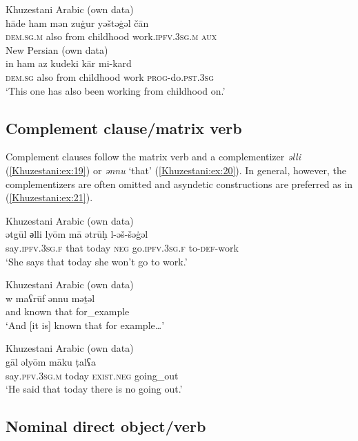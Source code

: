 \documentclass[output=paper,colorlinks,citecolor=brown,draftmode]{langscibook}
\begin{document}
\ea\label{Khuzestani:ex:18}
\ea\label{Khuzestani:ex:18a}
Khuzestani Arabic (own data) \\
\gll hāde ham mən zuġur yəštəġəl čān \\
\textsc{dem.sg.m} also from childhood work\textsc{.ipfv.3sg.m} \textsc{aux} \\
\ex\label{Khuzestani:ex:18b}
New Persian (own data) \\
\gll in ham az kudeki kār mi-kard \\
\textsc{dem.sg} also from childhood work \textsc{prog-}do\textsc{.pst.3sg} \\
\glt `This one has also been working from childhood on.' 
\z
\z


\subsection{Complement clause/matrix verb }\label{Khuzestani:ss:2.7}

Complement clauses follow the matrix verb and a complementizer \textit{əlli} (\ref{Khuzestani:ex:19}) or \textit{ənnu} `that' (\ref{Khuzestani:ex:20}). In general, however, the complementizers are often omitted and asyndetic constructions are preferred as in (\ref{Khuzestani:ex:21}). 

\ea\label{Khuzestani:ex:19}
Khuzestani Arabic (own data) \\
\gll ətgūl әlli lyōm mā ətrūḥ l-əš-šəġəl \\
say\textsc{.ipfv.3sg.f} that today \textsc{neg} go\textsc{.ipfv.3sg.f } to\textsc{-def-}work \\
\glt `She says that today she won't go to work.' 
\z

\ea\label{Khuzestani:ex:20}
Khuzestani Arabic (own data) \\
\gll w maʕrūf ənnu məṯəl \\
and known that for\_example \\
\glt `And [it is] known that for example…' 
\z

\ea\label{Khuzestani:ex:21}
Khuzestani Arabic (own data) \\
\gll gāl əlyōm māku ṭalʕa \\
say\textsc{.pfv.3sg.m} today \textsc{exist.neg} going\_out \\
\glt `He said that today there is no going out.' 
\z

\subsection{Nominal direct object/verb }\label{Khuzestani:ss:2.8}
\end{document}
